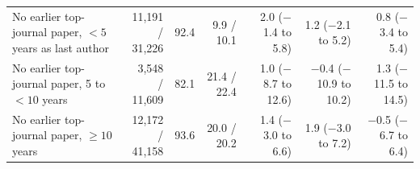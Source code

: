 \begin{table}[H]
\begin{tabularx}{\linewidth}{>{\raggedright\arraybackslash}Xrrrrrr}
No earlier top-journal paper, $<5$ years as last author & \makecell[rt]{11,191 /\\31,226} & 92.4 & 9.9 / 10.1 & \makecell[rt]{2.0\\($-$1.4 to 5.8)} & \makecell[rt]{1.2\\($-$2.1 to 5.2)} & \makecell[rt]{0.8\\($-$3.4 to 5.4)} \\
No earlier top-journal paper, 5 to $<10$ years & \makecell[rt]{3,548 /\\11,609} & 82.1 & 21.4 / 22.4 & \makecell[rt]{1.0\\($-$8.7 to 12.6)} & \makecell[rt]{$-$0.4\\($-$10.9 to 10.2)} & \makecell[rt]{1.3\\($-$11.5 to 14.5)} \\
No earlier top-journal paper, $\geq 10$ years & \makecell[rt]{12,172 /\\41,158} & 93.6 & 20.0 / 20.2 & \makecell[rt]{1.4\\($-$3.0 to 6.6)} & \makecell[rt]{1.9\\($-$3.0 to 7.2)} & \makecell[rt]{$-$0.5\\($-$6.7 to 6.4)} \\
\bottomrule
\end{tabularx}
\end{table}

